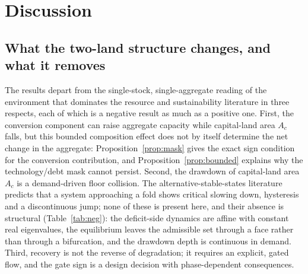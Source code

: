 \documentclass[preprint,12pt,authoryear]{elsarticle}
\begin{document}
\section{Discussion}\label{sec:discussion}

\subsection{What the two-land structure changes, and what it removes}

The results depart from the single-stock, single-aggregate reading of the environment that dominates the resource and sustainability literature \citep{Schaefer1954,May1973,Meadows1972,Meadows2004,WackernagelRees1996,BranderTaylor1998} in three respects, each of which is a negative result as much as a positive one. First, the conversion component can raise aggregate capacity while capital-land area $A_c$ falls, but this bounded composition effect does not by itself determine the net change in the aggregate: Proposition~\ref{prop:mask} gives the exact sign condition for the conversion contribution, and Proposition~\ref{prop:bounded} explains why the technology/debt mask cannot persist. Second, the drawdown of capital-land area $A_c$ is a demand-driven floor collision. The alternative-stable-states literature \citep{Scheffer2001} predicts that a system approaching a fold shows critical slowing down, hysteresis and a discontinuous jump; none of these is present here, and their absence is structural (Table~\ref{tab:neg}): the deficit-side dynamics are affine with constant real eigenvalues, the equilibrium leaves the admissible set through a face rather than through a bifurcation, and the drawdown depth is continuous in demand. Third, recovery is not the reverse of degradation; it requires an explicit, gated flow, and the gate sign is a design decision with phase-dependent consequences.
\end{document}
